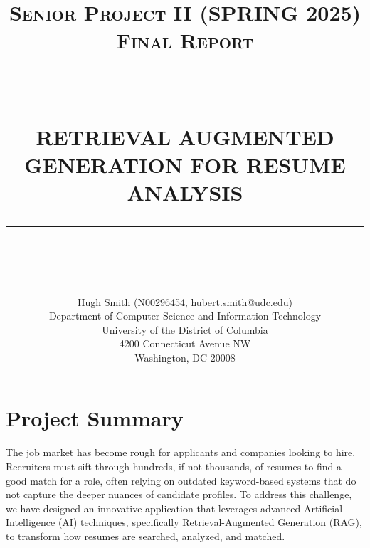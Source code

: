 \documentclass[12pt]{report}
\newcommand{\HRule}[1]{\rule{\linewidth}{#1}}
\begin{document}
\title{ \normalsize \textsc{Senior Project II (SPRING 2025)\\Final Report}
		\HRule{0.5pt} \\
		\LARGE \textbf{\uppercase{Retrieval Augmented Generation for Resume Analysis}}
		\HRule{2pt} \\ [0.5cm]
		\normalsize \vspace*{5\baselineskip}}
		
\date{}

\author{Hugh Smith (N00296454, hubert.smith@udc.edu)\\
		Department of Computer Science and Information Technology\\
		University of the District of Columbia\\
		4200 Connecticut Avenue NW\\
		Washington, DC 20008}
\maketitle

\tableofcontents

\thispagestyle{empty} %

\newpage

\sectionfont{\scshape}


\section{Project Summary}

The job market has become rough for applicants and companies looking to hire. Recruiters must sift through hundreds, if not thousands, of resumes to find a good match for a role, often relying on outdated keyword-based systems that do not capture the deeper nuances of candidate profiles. To address this challenge, we have designed an innovative application that leverages advanced Artificial Intelligence (AI) techniques, specifically Retrieval-Augmented Generation (RAG), to transform how resumes are searched, analyzed, and matched.
\end{document}
